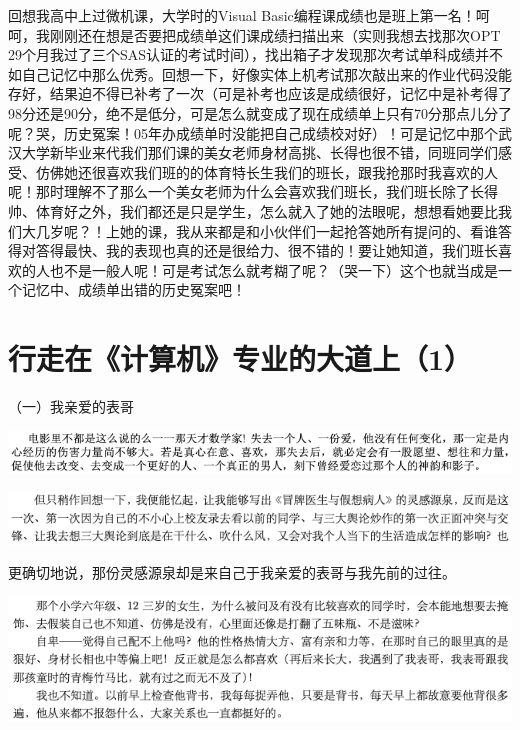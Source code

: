 \documentclass[9pt, b5paper]{article}
\begin{document}
回想我高中上过微机课，大学时的Visual Basic编程课成绩也是班上第一名！呵呵，我刚刚还在想是否要把成绩单这们课成绩扫描出来（实则我想去找那次OPT 29个月我过了三个SAS认证的考试时间），找出箱子才发现那次考试单科成绩并不如自己记忆中那么优秀。回想一下，好像实体上机考试那次敲出来的作业代码没能存好，结果迫不得已补考了一次（可是补考也应该是成绩很好，记忆中是补考得了98分还是90分，绝不是低分，可是怎么就变成了现在成绩单上只有70分那点儿分了呢？哭，历史冤案！05年办成绩单时没能把自己成绩校对好）！可是记忆中那个武汉大学新毕业来代我们那们课的美女老师身材高挑、长得也很不错，同班同学们感受、仿佛她还很喜欢我们班的的体育特长生我们的班长，跟我抢那时我喜欢的人呢！那时理解不了那么一个美女老师为什么会喜欢我们班长，我们班长除了长得帅、体育好之外，我们都还是只是学生，怎么就入了她的法眼呢，想想看她要比我们大几岁呢？！上她的课，我从来都是和小伙伴们一起抢答她所有提问的、看谁答得对答得最快、我的表现也真的还是很给力、很不错的！要让她知道，我们班长喜欢的人也不是一般人呢！可是考试怎么就考糊了呢？（哭一下）这个也就当成是一个记忆中、成绩单出错的历史冤案吧！



\section{行走在《计算机》专业的大道上（1）}
\label{sec:org41ae109}

（一）我亲爱的表哥

\begin{center}
\includegraphics[width=.9\linewidth]{./pic/backups_plans_20210420_115239.png}
\end{center}

\begin{center}
\includegraphics[width=.9\linewidth]{./pic/backups_plans_20210424_085313.png}
\end{center}

更确切地说，那份灵感源泉却是来自己于我亲爱的表哥与我先前的过往。 

\begin{center}
\includegraphics[width=.9\linewidth]{./pic/backups_plans_20210424_112502.png}
\end{center}
\end{document}
